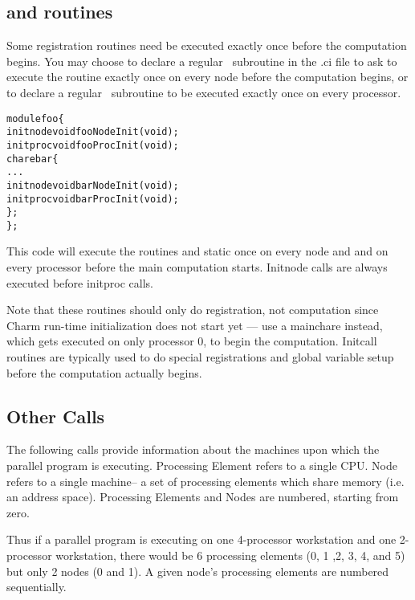\subsection{ and  routines}
\label{initcall}
\experimental{}
Some registration routines need be executed exactly once
before the computation begins. You may choose to 
declare a regular  \CC\ subroutine  in the .ci file
to ask \charmpp to execute the routine exactly once on every node before the
computation begins, or to declare a regular  \CC\ subroutine 
to be executed exactly once on every processor.

\begin{alltt}
module foo \{
    initnode void fooNodeInit(void);
    initproc void fooProcInit(void);
    chare bar \{
        ...
        initnode void barNodeInit(void);
        initproc void barProcInit(void);
    \};
\};
\end{alltt}

This code will execute the routines  and static 
 once on every node and 
and  on every processor before the main computation starts.
Initnode calls are always executed before initproc calls.

Note that these routines should only do registration, not computation since
Charm run-time initialization does not start yet ---
use a mainchare instead, which gets executed on only processor 0,
to begin the computation.  Initcall routines are typically
used to do special registrations and global variable setup
before the computation actually begins.


\subsection{Other Calls}

\label{other Charm++ calls}

The following calls provide information about the machines upon which the
parallel program is executing.  Processing Element refers to a single CPU.
Node refers to a single machine-- a set of processing elements which share
memory (i.e. an address space).  Processing Elements and Nodes are numbered,
starting from zero.

Thus if a parallel program is executing on one 4-processor workstation and one
2-processor workstation, there would be 6 processing elements (0, 1 ,2, 3, 4,
and 5) but only 2 nodes (0 and 1).  A given node's processing elements are
numbered sequentially.

